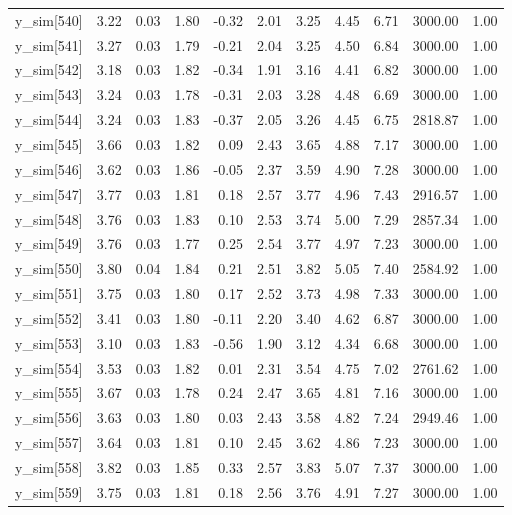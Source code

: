 \begin{table}[ht]
\begin{tabular}{rrrrrrrrrrr}
  y\_sim[540] & 3.22 & 0.03 & 1.80 & -0.32 & 2.01 & 3.25 & 4.45 & 6.71 & 3000.00 & 1.00 \\ 
  y\_sim[541] & 3.27 & 0.03 & 1.79 & -0.21 & 2.04 & 3.25 & 4.50 & 6.84 & 3000.00 & 1.00 \\ 
  y\_sim[542] & 3.18 & 0.03 & 1.82 & -0.34 & 1.91 & 3.16 & 4.41 & 6.82 & 3000.00 & 1.00 \\ 
  y\_sim[543] & 3.24 & 0.03 & 1.78 & -0.31 & 2.03 & 3.28 & 4.48 & 6.69 & 3000.00 & 1.00 \\ 
  y\_sim[544] & 3.24 & 0.03 & 1.83 & -0.37 & 2.05 & 3.26 & 4.45 & 6.75 & 2818.87 & 1.00 \\ 
  y\_sim[545] & 3.66 & 0.03 & 1.82 & 0.09 & 2.43 & 3.65 & 4.88 & 7.17 & 3000.00 & 1.00 \\ 
  y\_sim[546] & 3.62 & 0.03 & 1.86 & -0.05 & 2.37 & 3.59 & 4.90 & 7.28 & 3000.00 & 1.00 \\ 
  y\_sim[547] & 3.77 & 0.03 & 1.81 & 0.18 & 2.57 & 3.77 & 4.96 & 7.43 & 2916.57 & 1.00 \\ 
  y\_sim[548] & 3.76 & 0.03 & 1.83 & 0.10 & 2.53 & 3.74 & 5.00 & 7.29 & 2857.34 & 1.00 \\ 
  y\_sim[549] & 3.76 & 0.03 & 1.77 & 0.25 & 2.54 & 3.77 & 4.97 & 7.23 & 3000.00 & 1.00 \\ 
  y\_sim[550] & 3.80 & 0.04 & 1.84 & 0.21 & 2.51 & 3.82 & 5.05 & 7.40 & 2584.92 & 1.00 \\ 
  y\_sim[551] & 3.75 & 0.03 & 1.80 & 0.17 & 2.52 & 3.73 & 4.98 & 7.33 & 3000.00 & 1.00 \\ 
  y\_sim[552] & 3.41 & 0.03 & 1.80 & -0.11 & 2.20 & 3.40 & 4.62 & 6.87 & 3000.00 & 1.00 \\ 
  y\_sim[553] & 3.10 & 0.03 & 1.83 & -0.56 & 1.90 & 3.12 & 4.34 & 6.68 & 3000.00 & 1.00 \\ 
  y\_sim[554] & 3.53 & 0.03 & 1.82 & 0.01 & 2.31 & 3.54 & 4.75 & 7.02 & 2761.62 & 1.00 \\ 
  y\_sim[555] & 3.67 & 0.03 & 1.78 & 0.24 & 2.47 & 3.65 & 4.81 & 7.16 & 3000.00 & 1.00 \\ 
  y\_sim[556] & 3.63 & 0.03 & 1.80 & 0.03 & 2.43 & 3.58 & 4.82 & 7.24 & 2949.46 & 1.00 \\ 
  y\_sim[557] & 3.64 & 0.03 & 1.81 & 0.10 & 2.45 & 3.62 & 4.86 & 7.23 & 3000.00 & 1.00 \\ 
  y\_sim[558] & 3.82 & 0.03 & 1.85 & 0.33 & 2.57 & 3.83 & 5.07 & 7.37 & 3000.00 & 1.00 \\ 
  y\_sim[559] & 3.75 & 0.03 & 1.81 & 0.18 & 2.56 & 3.76 & 4.91 & 7.27 & 3000.00 & 1.00 \\ 

\end{tabular}
\end{table}
